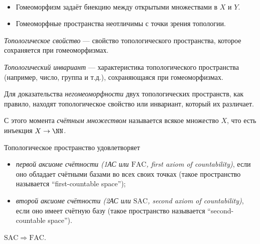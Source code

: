 \documentclass[12pt,a4paper]{article}
\newcommand{\FAC}{\ensuremath{\mathrm{FAC}}\xspace}
\newcommand{\SAC}{\ensuremath{\mathrm{SAC}}\xspace}
\begin{document}
    \begin{remark}\ 
        \begin{itemize}
            \item Гомеоморфизм задаёт биекцию между открытыми множествами в $X$ и $Y$.
            \item Гомеоморфные пространства неотличимы с точки зрения топологии.
        \end{itemize}
    \end{remark}

    \begin{definition}
        \emph{Топологическое свойство} --- свойство топологического пространства, которое сохраняется при гомеоморфизмах.

        \emph{Топологический инвариант} --- характеристика топологического пространства (например, число, группа и т.д.), сохраняющаяся при гомеоморфизмах.
    \end{definition}

    \begin{remark*}
        Для доказательства \emph{негомеоморфности} двух топологических пространств, как правило, находят топологическое свойство или инвариант, который их различает.
    \end{remark*}

    \begin{remark*}
        С этого момента \emph{счётным множеством} называется всякое множество $X$, что есть инъекция $X \to \NN$. 
    \end{remark*}

    \begin{definition}
        Топологическое пространство удовлетворяет
        \begin{itemize}
            \item \emph{первой аксиоме счётности (1АС или \FAC , first axiom of countability)}, если оно обладает счётными базами во всех своих точках (такое пространство называется ``first-countable space'');
            \item \emph{второй аксиоме счётности (2АС или \SAC , second axiom of countability)}, если оно имеет счётную базу (такое пространство называется ``second-countable space'').
        \end{itemize}
    \end{definition}

    \begin{theorem}
        $\SAC \Rightarrow \FAC$.
    \end{theorem}
\end{document}
